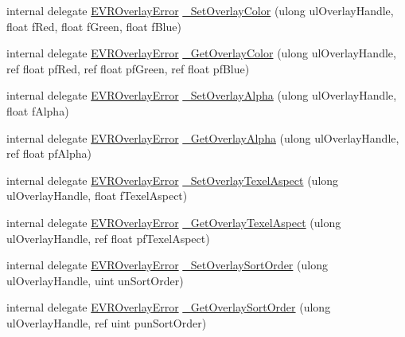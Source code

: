 \begin{DoxyCompactItemize}
\item 
internal delegate \mbox{\hyperlink{namespace_valve_1_1_v_r_aaee5c5144f42b7969d45b854f51b0c18}{E\+V\+R\+Overlay\+Error}} \mbox{\hyperlink{struct_valve_1_1_v_r_1_1_i_v_r_overlay_ae4f9f357c73e29c9b4e88c6f8070df8e}{\+\_\+\+Set\+Overlay\+Color}} (ulong ul\+Overlay\+Handle, float f\+Red, float f\+Green, float f\+Blue)
\item 
internal delegate \mbox{\hyperlink{namespace_valve_1_1_v_r_aaee5c5144f42b7969d45b854f51b0c18}{E\+V\+R\+Overlay\+Error}} \mbox{\hyperlink{struct_valve_1_1_v_r_1_1_i_v_r_overlay_a8a389fa30b6c03914919dca699444cdd}{\+\_\+\+Get\+Overlay\+Color}} (ulong ul\+Overlay\+Handle, ref float pf\+Red, ref float pf\+Green, ref float pf\+Blue)
\item 
internal delegate \mbox{\hyperlink{namespace_valve_1_1_v_r_aaee5c5144f42b7969d45b854f51b0c18}{E\+V\+R\+Overlay\+Error}} \mbox{\hyperlink{struct_valve_1_1_v_r_1_1_i_v_r_overlay_a5bdec940e24ef87b9e12c5e9f91862f0}{\+\_\+\+Set\+Overlay\+Alpha}} (ulong ul\+Overlay\+Handle, float f\+Alpha)
\item 
internal delegate \mbox{\hyperlink{namespace_valve_1_1_v_r_aaee5c5144f42b7969d45b854f51b0c18}{E\+V\+R\+Overlay\+Error}} \mbox{\hyperlink{struct_valve_1_1_v_r_1_1_i_v_r_overlay_aaaf6e210a7faf2e505719a884eef3529}{\+\_\+\+Get\+Overlay\+Alpha}} (ulong ul\+Overlay\+Handle, ref float pf\+Alpha)
\item 
internal delegate \mbox{\hyperlink{namespace_valve_1_1_v_r_aaee5c5144f42b7969d45b854f51b0c18}{E\+V\+R\+Overlay\+Error}} \mbox{\hyperlink{struct_valve_1_1_v_r_1_1_i_v_r_overlay_a479ce5b1183e93ec53ddbaa1bd62f264}{\+\_\+\+Set\+Overlay\+Texel\+Aspect}} (ulong ul\+Overlay\+Handle, float f\+Texel\+Aspect)
\item 
internal delegate \mbox{\hyperlink{namespace_valve_1_1_v_r_aaee5c5144f42b7969d45b854f51b0c18}{E\+V\+R\+Overlay\+Error}} \mbox{\hyperlink{struct_valve_1_1_v_r_1_1_i_v_r_overlay_a235f2a043c603054667fe6c3df416dce}{\+\_\+\+Get\+Overlay\+Texel\+Aspect}} (ulong ul\+Overlay\+Handle, ref float pf\+Texel\+Aspect)
\item 
internal delegate \mbox{\hyperlink{namespace_valve_1_1_v_r_aaee5c5144f42b7969d45b854f51b0c18}{E\+V\+R\+Overlay\+Error}} \mbox{\hyperlink{struct_valve_1_1_v_r_1_1_i_v_r_overlay_a49aeba8cdd673c4e9b5e5e3cc1e566d6}{\+\_\+\+Set\+Overlay\+Sort\+Order}} (ulong ul\+Overlay\+Handle, uint un\+Sort\+Order)
\item 
internal delegate \mbox{\hyperlink{namespace_valve_1_1_v_r_aaee5c5144f42b7969d45b854f51b0c18}{E\+V\+R\+Overlay\+Error}} \mbox{\hyperlink{struct_valve_1_1_v_r_1_1_i_v_r_overlay_a7e5ffdaf685b8384808a52d2fef43022}{\+\_\+\+Get\+Overlay\+Sort\+Order}} (ulong ul\+Overlay\+Handle, ref uint pun\+Sort\+Order)

\end{DoxyCompactItemize}
